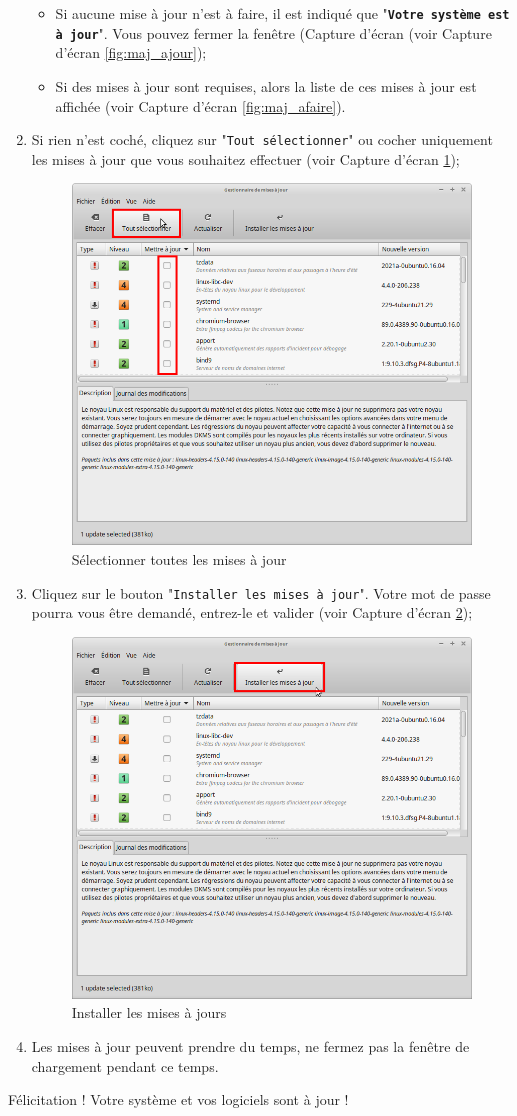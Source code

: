 \documentclass[12pt]{book}
\begin{document}
\begin{enumerate}
\begin{figure}[h]
				\end{figure}
			\begin{itemize}
				\item Si aucune mise à jour n'est à faire, il est indiqué que "\texttt{\textbf{Votre système est à jour}}".
				Vous pouvez fermer la fenêtre (Capture d'écran (voir Capture d'écran \ref{fig:maj_ajour});
				\item Si des mises à jour sont requises, alors la liste de ces mises à jour est affichée (voir Capture d'écran \ref{fig:maj_afaire}).
			\end{itemize}
			\item Si rien n'est coché, cliquez sur "\texttt{Tout sélectionner}" ou cocher uniquement les mises à jour que vous souhaitez effectuer (voir Capture d'écran \ref{fig:maj_select});
			\begin{figure}[h]
				\centering
				\includegraphics[width=.6\textwidth]{include/maj_select.png}
				\caption{Sélectionner toutes les mises à jour}
				\label{fig:maj_select}
			\end{figure}
			\item Cliquez sur le bouton "\texttt{Installer les mises à jour}".
					Votre mot de passe pourra vous être demandé, entrez-le et valider (voir Capture d'écran \ref{fig:maj_install});
			\begin{figure}[h]
				\centering
				\includegraphics[width=.6\textwidth]{include/maj_install.png}
				\caption{Installer les mises à jours}
				\label{fig:maj_install}
			\end{figure}
			\item Les mises à jour peuvent prendre du temps, ne fermez pas la fenêtre de chargement pendant ce temps.
		\end{enumerate}
		Félicitation ! Votre système et vos logiciels sont à jour !
\end{document}
